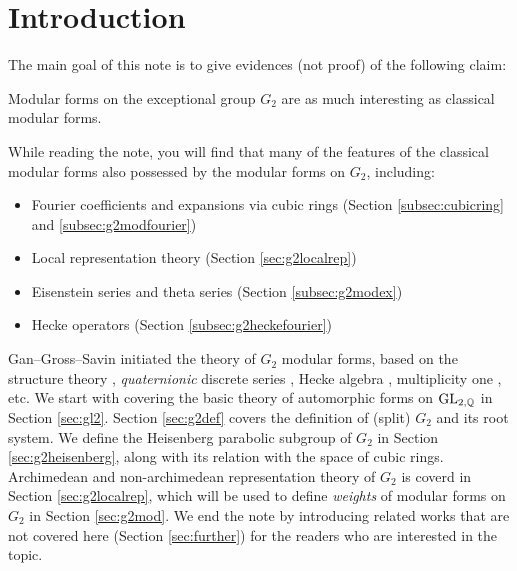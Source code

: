 \section{Introduction}

The main goal of this note is to give evidences (not proof) of the following claim:

\begin{claim}
Modular forms on the exceptional group $G_2$ are as much interesting as classical modular forms.
\end{claim}
While reading the note, you will find that many of the features of the classical modular forms also possessed by the modular forms on $G_2$, including:
\begin{itemize}
    \item Fourier coefficients and expansions via cubic rings (Section \ref{subsec:cubicring} and \ref{subsec:g2modfourier})
    \item Local representation theory (Section \ref{sec:g2localrep})
    \item Eisenstein series and theta series (Section \ref{subsec:g2modex})
    \item Hecke operators (Section \ref{subsec:g2heckefourier})
\end{itemize}
Gan--Gross--Savin \cite{gan2002fourier} initiated the theory of $G_2$ modular forms, based on the structure theory \cite{baez2002octonions}, \emph{quaternionic} discrete series \cite{gross1996quaternionic}, Hecke algebra \cite{gross1998satake}, multiplicity one \cite{wallach2003generalized}, etc.
We start with covering the basic theory of automorphic forms on $\mathrm{GL}_{2, \mathbb{Q}}$ in Section \ref{sec:gl2}.
Section \ref{sec:g2def} covers the definition of (split) $G_2$ and its root system.
We define the Heisenberg parabolic subgroup of $G_2$ in Section \ref{sec:g2heisenberg}, along with its relation with the space of cubic rings.
Archimedean and non-archimedean representation theory of $G_2$ is coverd in Section \ref{sec:g2localrep}, which will be used to define \emph{weights} of modular forms on $G_2$ in Section \ref{sec:g2mod}.
We end the note by introducing related works that are not covered here (Section \ref{sec:further}) for the readers who are interested in the topic.
